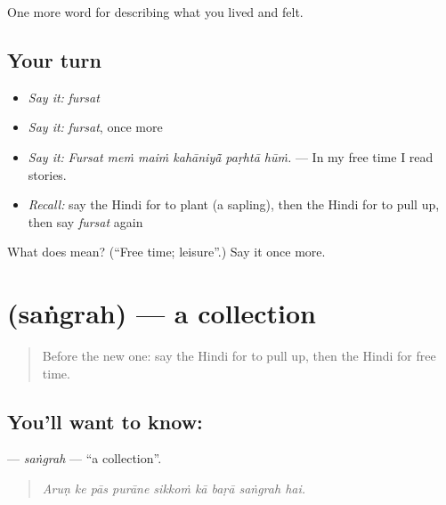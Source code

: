 \begin{grammarlens}[title={What you've built}]
One more word for describing what you lived and felt.
\end{grammarlens}

\subsection*{Your turn}
\begin{itemize}
\raggedright
  \item \emph{Say it:} \emph{fursat}
  \item \emph{Say it:} \emph{fursat}, once more
  \item \emph{Say it:} \emph{Fursat meṁ maiṁ kahāniyā̃ paṛhtā hūṁ.} — In my free time I read stories.
  \item \emph{Recall:} say the Hindi for to plant (a sapling), then the Hindi for to pull up, then say \emph{fursat} again
\end{itemize}

\begin{tcolorbox}[breakable,colback=teal!4,colframe=teal!35!black,title={Before you move on}]
What does  mean? (\textquotedblleft{}Free time; leisure\textquotedblright{}.) Say it once more.
\end{tcolorbox}
\section[\texorpdfstring{\hi{संग्रह} (saṅgrah)}{संग्रह (saṅgrah)}]{ (saṅgrah) — a collection}

\label{lesson:HI-C526-sangrah}



\begin{quote}
Before the new one: say the Hindi for to pull up, then the Hindi for free time.
\end{quote}

\subsection*{You'll want to know: }
\textbf{} — \emph{saṅgrah} — \textquotedblleft{}a collection\textquotedblright{}.

\begin{quote}
        
\end{quote}

\begin{quote}
\emph{Aruṇ ke pās purāne sikkoṁ kā baṛā saṅgrah hai.}
\end{quote}

